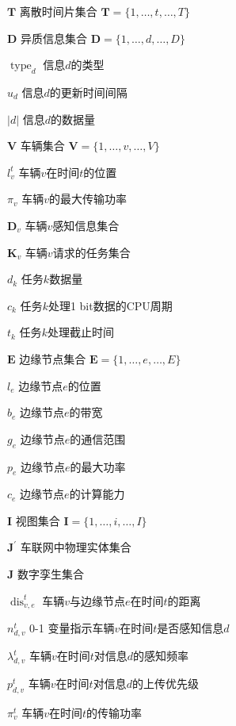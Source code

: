 \begin{denotation}[20mm][15mm]
	\item[$\mathbf{T}$] 离散时间片集合 $\mathbf{T}=\{1, \ldots, t, \ldots, T\}$
	\item[$\mathbf{D}$] 异质信息集合 $\mathbf{D}=\{1, \ldots, d, \ldots, D\}$
	\item[$\operatorname{type}_d$] 信息$d$的类型
	\item[$u_d$] 信息$d$的更新时间间隔
	\item[$\left|d\right|$] 信息$d$的数据量
	\item[$\mathbf{V}$] 车辆集合 $\mathbf{V}=\{1, \ldots, v, \ldots, V\}$
	\item[$l_{v}^{t}$] 车辆$v$在时间$t$的位置
	\item[$\pi_{v}$] 车辆$v$的最大传输功率
	\item[$\mathbf{D}_v$] 车辆$v$感知信息集合
	\item[$\mathbf{K}_{v}$] 车辆$v$请求的任务集合
	\item[$d_{k}$] 任务$k$数据量
	\item[$c_{k}$] 任务$k$处理1 bit数据的CPU周期
	\item[$t_{k}$] 任务$k$处理截止时间
	\item[$\mathbf{E}$] 边缘节点集合 $\mathbf{E}=\{1, \ldots, e, \ldots, E\}$
	\item[$l_{e}$] 边缘节点$e$的位置
	\item[$b_{e}$] 边缘节点$e$的带宽
	\item[$g_{e}$] 边缘节点$e$的通信范围
	\item[$p_{e}$] 边缘节点$e$的最大功率
	\item[$c_{e}$] 边缘节点$e$的计算能力
	\item[$\mathbf{I}$] 视图集合 $\mathbf{I}=\{1, \ldots, i, \ldots, I\}$
	\item[$\mathbf{J}^{\prime}$] 车联网中物理实体集合 
	\item[$\mathbf{J}$] 数字孪生集合 
	\item[$\operatorname{dis}_{v, e}^{t}$] 车辆$v$与边缘节点$e$在时间$t$的距离
	\item[$n_{d, v}^t$] 0-1 变量指示车辆$v$在时间$t$是否感知信息$d$
	\item[$\lambda_{d, v}^{t}$] 车辆$v$在时间$t$对信息$d$的感知频率
	\item[$p_{d, v}^{t}$] 车辆$v$在时间$t$对信息$d$的上传优先级
	\item[$\pi_{v}^t$] 车辆$v$在时间$t$的传输功率

\end{denotation}
